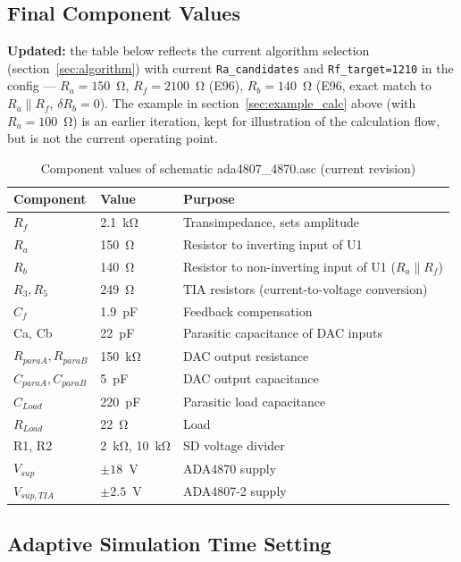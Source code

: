 \documentclass[a4paper, 12pt]{article}
\begin{document}
\subsection{Final Component Values}

\textbf{Updated:} the table below reflects the current algorithm selection
(section~\ref{sec:algorithm}) with current \texttt{Ra\_candidates} and
\texttt{Rf\_target=1210} in the config — \(R_a=150\)~Ω,
\(R_f=2100\)~Ω (E96), \(R_b=140\)~Ω (E96, exact match to
\(R_a\parallel R_f\), \(\delta R_b=0\)). The example in section~\ref{sec:example_calc}
above (with \(R_a=100\)~Ω) is an earlier iteration, kept for illustration of
the calculation flow, but is not the current operating point.

\begin{table}[H]
\centering
\caption{Component values of schematic ada4807\_4870.asc (current revision)}
\label{tab:components}
\begin{tabular}{@{}llp{6.5cm}@{}}
\toprule
\textbf{Component} & \textbf{Value} & \textbf{Purpose} \\
\midrule
\(R_f\)     & 2.1~kΩ & Transimpedance, sets amplitude \\
\(R_a\)     & 150~Ω   & Resistor to inverting input of U1 \\
\(R_b\)     & 140~Ω & Resistor to non-inverting input of U1 (\(R_a \parallel R_f\)) \\
\(R_3, R_5\) & 249~Ω   & TIA resistors (current-to-voltage conversion) \\
\(C_f\)     & 1.9~pF     & Feedback compensation \\
Ca, Cb     & 22~pF    & Parasitic capacitance of DAC inputs \\
\(R_{paraA}, R_{paraB}\) & 150~kΩ & DAC output resistance \\
\(C_{paraA}, C_{paraB}\) & 5~pF   & DAC output capacitance \\
\(C_{Load}\)  & 220~pF   & Parasitic load capacitance \\
\(R_{Load}\)  & 22~Ω    & Load \\
R1, R2     & 2~kΩ, 10~kΩ & SD voltage divider \\
\(V_{sup}\) & $\pm 18$~V & ADA4870 supply \\
\(V_{sup,TIA}\) & $\pm 2.5$~V & ADA4807-2 supply \\
\bottomrule
\end{tabular}
\end{table}

\subsection{Adaptive Simulation Time Setting}
\label{sec:adaptive_tran}
\end{document}
